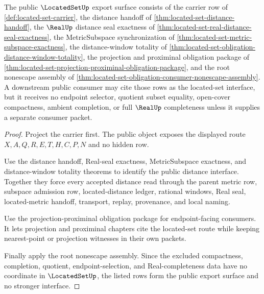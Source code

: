 \begin{theorem}
\label{thm:located-set-public-export}
The public $\LocatedSetUp$ export surface consists of the carrier row of \autoref{def:located-set-carrier}, the distance handoff of \autoref{thm:located-set-distance-handoff}, the $\RealUp$ distance seal exactness of \autoref{thm:located-set-real-distance-seal-exactness}, the MetricSubspace synchronization of \autoref{thm:located-set-metric-subspace-exactness}, the distance-window totality of \autoref{thm:located-set-obligation-distance-window-totality}, the projection and proximinal obligation package of \autoref{thm:located-set-projection-proximinal-obligation-package}, and the root nonescape assembly of \autoref{thm:located-set-obligation-consumer-nonescape-assembly}. A downstream public consumer may cite those rows as the located-set interface, but it receives no endpoint selector, quotient subset equality, open-cover compactness, ambient completion, or full $\RealUp$ completeness unless it supplies a separate consumer packet.
\end{theorem}
\begin{proof}
Project the carrier first. The public object exposes the displayed route $X,A,Q,R,E,T,H,C,P,N$ and no hidden row.

Use the distance handoff, Real-seal exactness, MetricSubspace exactness, and distance-window totality theorems to identify the public distance interface. Together they force every accepted distance read through the parent metric row, subspace admission row, located-distance ledger, rational windows, Real seal, located-metric handoff, transport, replay, provenance, and local naming.

Use the projection-proximinal obligation package for endpoint-facing consumers. It lets projection and proximinal chapters cite the located-set route while keeping nearest-point or projection witnesses in their own packets.

Finally apply the root nonescape assembly. Since the excluded compactness, completion, quotient, endpoint-selection, and Real-completeness data have no coordinate in $\LocatedSetUp$, the listed rows form the public export surface and no stronger interface.
\end{proof}


